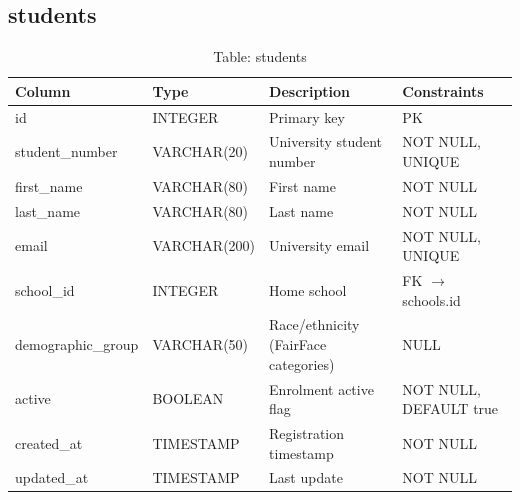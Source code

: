 \documentclass[12pt,a4paper]{report}
\begin{document}
\subsection{students}
\begin{table}[H]
\centering\small
\caption{Table: students}
\begin{tabularx}{\linewidth}{llXl}
\toprule
\textbf{Column} & \textbf{Type} & \textbf{Description} & \textbf{Constraints} \\
\midrule
id                  & INTEGER      & Primary key                         & PK \\
student\_number     & VARCHAR(20)  & University student number           & NOT NULL, UNIQUE \\
first\_name         & VARCHAR(80)  & First name                          & NOT NULL \\
last\_name          & VARCHAR(80)  & Last name                           & NOT NULL \\
email               & VARCHAR(200) & University email                    & NOT NULL, UNIQUE \\
school\_id          & INTEGER      & Home school                         & FK $\to$ schools.id \\
demographic\_group  & VARCHAR(50)  & Race/ethnicity (FairFace categories)& NULL \\
active              & BOOLEAN      & Enrolment active flag               & NOT NULL, DEFAULT true \\
created\_at         & TIMESTAMP    & Registration timestamp              & NOT NULL \\
updated\_at         & TIMESTAMP    & Last update                         & NOT NULL \\
\bottomrule
\end{tabularx}
\end{table}
\end{document}
